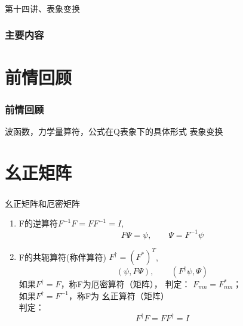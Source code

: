 \begin{frame} [plain]
    \frametitle{}
    \Background[1] 
    \begin{center}
    { {\huge 第十四讲、表象变换 }}
    \end{center}  
    \addtocounter{framenumber}{-1}   
\end{frame}

\begin{frame}
        \frametitle{主要内容}
        \transfade
        \tableofcontents
        \addtocounter{framenumber}{-1} 
\end{frame}

\section{前情回顾}

\begin{frame}
    \frametitle{前情回顾}
    \begin{itemize}
       \done 波函数，力学量算符，公式在Q表象下的具体形式 
       \todo 表象变换
    \end{itemize}
\end{frame} 

\section{幺正矩阵}

\begin{frame} 
    \frametitle{}
    \begin{tcolorbox1}{幺正矩阵和厄密矩阵}
        \begin{enumerate}
            \item F的逆算符$F^{-1}F=FF^{-1}=I$, $$F\Psi=\psi, \qquad \Psi=F^{-1}\psi$$  
            \item F的共轭算符(称伴算符) $F^{\dagger}=(F^*)^T$, $$ (\psi, F\Psi), \qquad (F^{\dagger}\psi, \Psi)$$
            如果$F^{\dagger } =F$，称F为{\color{red}厄密算符（矩阵）}， 
            判定： $F_{mn}=F_{nm} ^*$； 
            \\ 如果$ F^{\dagger }=F^{-1}$，称F为{\color{red} 幺正算符（矩阵）}\\
            判定：$$F^{\dagger} F= FF^{\dagger}=I$$
        \end{enumerate}       
    \end{tcolorbox1}
\end{frame}

